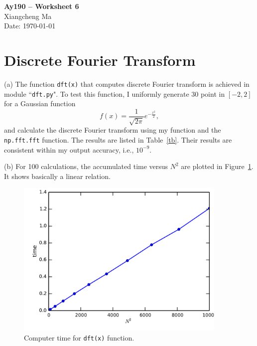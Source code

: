 \documentclass[11pt,letterpaper]{article}
\begin{document}
\begin{center}
\Large
{\bf Ay190 -- Worksheet 6} \\
\large
Xiangcheng Ma \\
Date: \today
\end{center}

\section*{Discrete Fourier Transform}

(a) The function {\tt dft(x)}  that computes discrete Fourier transform is achieved in module ``{\tt dft.py}". To test this function, I uniformly generate 30 point in $[-2,2]$ for a Gaussian function
\begin{equation}
  f(x) = \frac{1}{\sqrt{2\pi}} e^{-\frac{x^2}{2}} ,
\end{equation}
and calculate the discrete Fourier transform using my function and the {\tt np.fft.fft} function. The results are listed in Table~\ref{tb}. Their results are consistent within my output accuracy, i.e., $10^{-9}$.


(b) For 100 calculations, the accumulated time versus $N^2$ are plotted in Figure~\ref{fig1}. It shows basically a linear relation.
\begin{figure}[bth]
\centering
\includegraphics[width=0.9\textwidth]{fig1.pdf}
\caption{Computer time for {\tt dft(x)} function.}
\label{fig1}
\end{figure}
\end{document}
